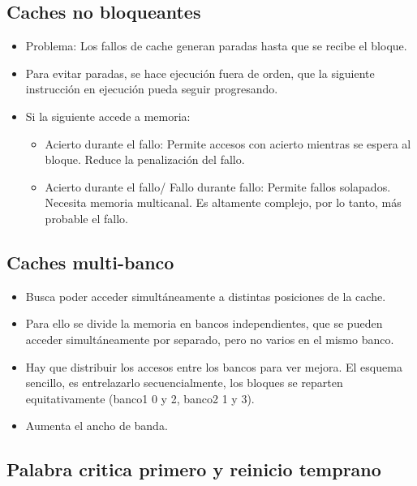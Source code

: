 \documentclass[12pt, twoside, openright]{report} %
\begin{document}
  \subsection{Caches no bloqueantes}

    \begin{itemize}
    
    \item
      Problema: Los fallos de cache generan paradas hasta que se recibe
      el bloque.
    \item
      Para evitar paradas, se hace ejecución fuera de orden, que la
      siguiente instrucción en ejecución pueda seguir progresando.
    \item
      Si la siguiente accede a memoria:

      \begin{itemize}
      
      \item
        Acierto durante el fallo: Permite accesos con acierto mientras
        se espera al bloque. Reduce la penalización del fallo.
      \item
        Acierto durante el fallo/ Fallo durante fallo: Permite fallos
        solapados. Necesita memoria multicanal. Es altamente complejo,
        por lo tanto, más probable el fallo.
      \end{itemize}
    \end{itemize}
  \subsection{Caches multi-banco}

    \begin{itemize}
    
    \item
      Busca poder acceder simultáneamente a distintas posiciones de la
      cache.
    \item
      Para ello se divide la memoria en bancos independientes, que se
      pueden acceder simultáneamente por separado, pero no varios en el
      mismo banco.
    \item
      Hay que distribuir los accesos entre los bancos para ver mejora.
      El esquema sencillo, es entrelazarlo secuencialmente, los bloques
      se reparten equitativamente (banco1 0 y 2, banco2 1 y 3).
    \item
      Aumenta el ancho de banda.
    \end{itemize}
  \subsection{Palabra critica primero y reinicio temprano}
\end{document}

